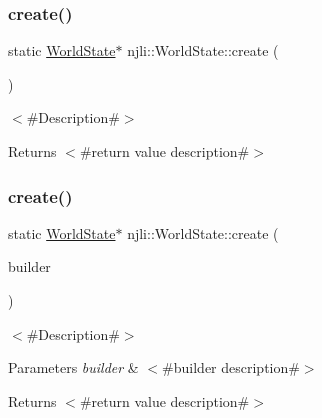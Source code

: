 \subsubsection{\texorpdfstring{create()}{create()}\hspace{0.1cm}{\footnotesize\ttfamily [2/3]}}
{\footnotesize\ttfamily static \mbox{\hyperlink{classnjli_1_1_world_state}{World\+State}}$\ast$ njli\+::\+World\+State\+::create (\begin{DoxyParamCaption}{ }\end{DoxyParamCaption})\hspace{0.3cm}{\ttfamily [static]}}

$<$\#\+Description\#$>$

\begin{DoxyReturn}{Returns}
$<$\#return value description\#$>$ 
\end{DoxyReturn}
\mbox{\label{classnjli_1_1_world_state_a863bd5c20a3d3f9f62844ecf2c911099}} 
\subsubsection{\texorpdfstring{create()}{create()}\hspace{0.1cm}{\footnotesize\ttfamily [3/3]}}
{\footnotesize\ttfamily static \mbox{\hyperlink{classnjli_1_1_world_state}{World\+State}}$\ast$ njli\+::\+World\+State\+::create (\begin{DoxyParamCaption}\item[{const \mbox{\hyperlink{classnjli_1_1_world_state_builder}{World\+State\+Builder}} \&}]{builder }\end{DoxyParamCaption})\hspace{0.3cm}{\ttfamily [static]}}

$<$\#\+Description\#$>$


\begin{DoxyParams}{Parameters}
{\em builder} & $<$\#builder description\#$>$\\
\hline
\end{DoxyParams}
\begin{DoxyReturn}{Returns}
$<$\#return value description\#$>$ 
\end{DoxyReturn}
\mbox{\label{classnjli_1_1_world_state_a1db73165c58d1b8d509129c18346b457}} 
